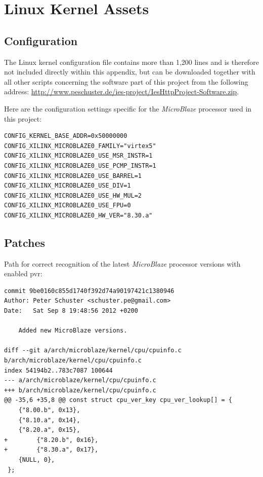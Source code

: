 \section{Linux Kernel Assets}

\subsection{Configuration}

The Linux kernel configuration file contains more than 1,200 lines and is therefore not included directly within this appendix, but can be downloaded together with all other scripts concerning the software part of this project from the following address: \url{http://www.peschuster.de/ies-project/IesHttpProject-Software.zip}.

Here are the configuration settings specific for the \textit{MicroBlaze} processor used in this project:

\begin{verbatim}
CONFIG_KERNEL_BASE_ADDR=0x50000000
CONFIG_XILINX_MICROBLAZE0_FAMILY="virtex5"
CONFIG_XILINX_MICROBLAZE0_USE_MSR_INSTR=1
CONFIG_XILINX_MICROBLAZE0_USE_PCMP_INSTR=1
CONFIG_XILINX_MICROBLAZE0_USE_BARREL=1
CONFIG_XILINX_MICROBLAZE0_USE_DIV=1
CONFIG_XILINX_MICROBLAZE0_USE_HW_MUL=2
CONFIG_XILINX_MICROBLAZE0_USE_FPU=0
CONFIG_XILINX_MICROBLAZE0_HW_VER="8.30.a"
\end{verbatim}

 

\subsection{Patches}
\label{subsec:pvr_patch}

Path for correct recognition of the latest \textit{MicroBlaze} processor versions with enabled \gls{pvr}:

\begin{verbatim}
commit 9be0160c855d1740f392d74a90197421c1380946
Author: Peter Schuster <schuster.pe@gmail.com>
Date:   Sat Sep 8 19:48:56 2012 +0200

    Added new MicroBlaze versions.

diff --git a/arch/microblaze/kernel/cpu/cpuinfo.c b/arch/microblaze/kernel/cpu/cpuinfo.c
index 54194b2..783c7087 100644
--- a/arch/microblaze/kernel/cpu/cpuinfo.c
+++ b/arch/microblaze/kernel/cpu/cpuinfo.c
@@ -35,6 +35,8 @@ const struct cpu_ver_key cpu_ver_lookup[] = {
 	{"8.00.b", 0x13},
 	{"8.10.a", 0x14},
 	{"8.20.a", 0x15},
+        {"8.20.b", 0x16},
+        {"8.30.a", 0x17},
 	{NULL, 0},
 };
\end{verbatim}

